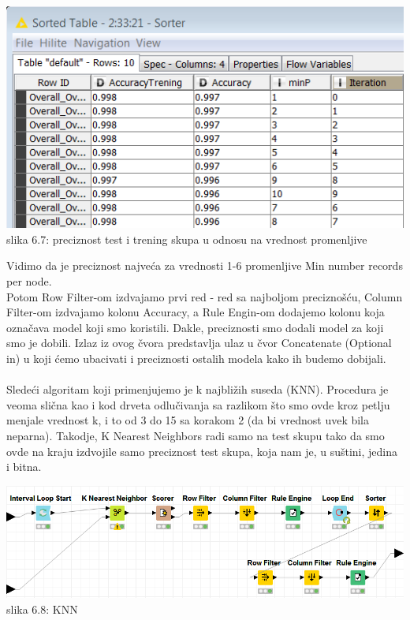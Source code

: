 \documentclass[10pt]{article}
\begin{document}
\begin{center}
\includegraphics[scale = 0.5]{PoslePnaTest}\\
slika 6.7: preciznost test i trening skupa u odnosu na vrednost promenljive\\
\end{center}

Vidimo da je preciznost najve\' ca za vrednosti 1-6 promenljive Min number records per node.\\
Potom Row Filter-om izdvajamo prvi red - red sa najboljom precizno\v s\' cu, Column Filter-om izdvajamo kolonu Accuracy, a Rule Engin-om dodajemo kolonu koja ozna\v cava model koji smo koristili. Dakle, preciznosti smo dodali model za koji smo je dobili. Izlaz iz ovog \v cvora predstavlja ulaz u \v cvor Concatenate (Optional in) u koji \' cemo ubacivati i preciznosti ostalih modela kako ih budemo dobijali.\\~\\
Slede\' ci algoritam koji primenjujemo je k najbli\v zih suseda (KNN). Procedura je veoma sli\v cna kao i kod drveta odlu\v civanja sa razlikom \v sto smo ovde kroz petlju menjale vrednost k, i to od 3 do 15 sa korakom 2 (da bi vrednost uvek bila neparna). Takodje, K Nearest Neighbors radi samo na test skupu tako da smo ovde na kraju izdvojile samo preciznost test skupa, koja nam je, u su\v stini, jedina i bitna.

\begin{center}
\includegraphics[width = \textwidth,height = 4.5 cm]{KNN1}
slika 6.8: KNN\\
\end{center}
\end{document}
